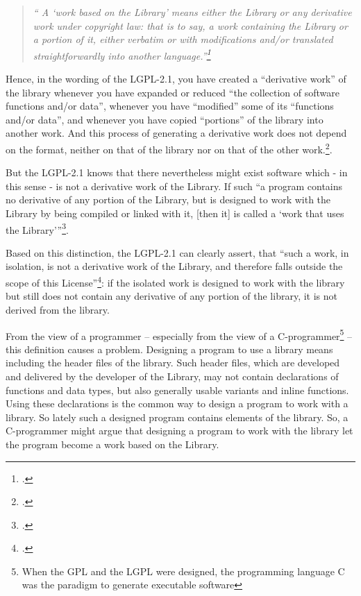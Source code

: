 \begin{quote}\emph{\enquote{
A \enquote{work based on the Library} means either the Library or any derivative
work under copyright law: that is to say, a work containing the Library or a portion
of it, either verbatim or with modifications and/or translated straightforwardly
into another language.}\footcite[cf.][\nopage wp §0]{Lgpl21OsiLicense1999a} }
\end{quote}

Hence, in the wording of the LGPL-2.1, you have created a \enquote{derivative
work} of the library whenever you have expanded or reduced \enquote{the
collection of software functions and/or data}, whenever you have
\enquote{modified} some of its \enquote{functions and/or data}, and whenever you
have copied \enquote{portions} of the library into another work. And this
process of generating a derivative work does not depend on the format, neither
on that of the library nor on that of the other work.\footcite[cf.][\nopage wp
§0]{Lgpl21OsiLicense1999a}.

But the LGPL-2.1 knows that there nevertheless might exist software which - in
this sense - is not a derivative work of the Library. If such \enquote{a
program contains no derivative of any portion of the Library, but is
designed to work with the Library by being compiled or linked with it, [then
it] is called a \enquote{work that uses the Library}}\footcite[cf.][\nopage wp
§5]{Lgpl21OsiLicense1999a}.

Based on this distinction, the LGPL-2.1 can clearly assert, that \enquote{such
a work, in isolation, is not a derivative work of the Library, and therefore
falls outside the scope of this License}\footcite[cf.][\nopage wp
§5]{Lgpl21OsiLicense1999a}: if the isolated work is designed to work with the
library but still does not contain any derivative of any portion of the library,
it is not derived from the library.

From the view of a programmer -- especially from the view of a
C-programmer\footnote{When the GPL and the LGPL were designed, the programming
language C was the paradigm to generate executable software} -- this definition
causes a problem. Designing a program to use a library means including the
header files of the library. Such header files, which are developed and
delivered by the developer of the Library, may not contain declarations of
functions and data types, but also generally usable variants and inline
functions. Using these declarations is the common way to design a program to
work with a library. So lately such a designed program contains elements of the
library. So, a C-programmer might argue that designing a program to work with
the library let the program become a work based on the Library.

